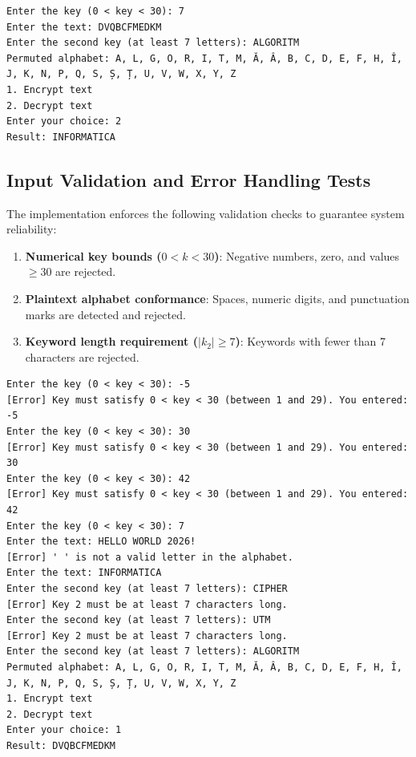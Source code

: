 \documentclass[12pt,a4paper]{article}
\begin{document}
\begin{lstlisting}[caption={Task 2 Decryption Execution}]
Enter the key (0 < key < 30): 7
Enter the text: DVQBCFMEDKM
Enter the second key (at least 7 letters): ALGORITM
Permuted alphabet: A, L, G, O, R, I, T, M, Ă, Â, B, C, D, E, F, H, Î, J, K, N, P, Q, S, Ș, Ț, U, V, W, X, Y, Z
1. Encrypt text
2. Decrypt text
Enter your choice: 2
Result: INFORMATICA
\end{lstlisting}

\subsection{Input Validation and Error Handling Tests}
The implementation enforces the following validation checks to guarantee system reliability:
\begin{enumerate}
    \item \textbf{Numerical key bounds ($0 < k < 30$)}: Negative numbers, zero, and values $\ge 30$ are rejected.
    \item \textbf{Plaintext alphabet conformance}: Spaces, numeric digits, and punctuation marks are detected and rejected.
    \item \textbf{Keyword length requirement ($|k_2| \ge 7$)}: Keywords with fewer than 7 characters are rejected.
\end{enumerate}

\begin{lstlisting}[caption={Input Validation Demonstration in Console}]
Enter the key (0 < key < 30): -5
[Error] Key must satisfy 0 < key < 30 (between 1 and 29). You entered: -5
Enter the key (0 < key < 30): 30
[Error] Key must satisfy 0 < key < 30 (between 1 and 29). You entered: 30
Enter the key (0 < key < 30): 42
[Error] Key must satisfy 0 < key < 30 (between 1 and 29). You entered: 42
Enter the key (0 < key < 30): 7
Enter the text: HELLO WORLD 2026!
[Error] ' ' is not a valid letter in the alphabet.
Enter the text: INFORMATICA
Enter the second key (at least 7 letters): CIPHER
[Error] Key 2 must be at least 7 characters long.
Enter the second key (at least 7 letters): UTM
[Error] Key 2 must be at least 7 characters long.
Enter the second key (at least 7 letters): ALGORITM
Permuted alphabet: A, L, G, O, R, I, T, M, Ă, Â, B, C, D, E, F, H, Î, J, K, N, P, Q, S, Ș, Ț, U, V, W, X, Y, Z
1. Encrypt text
2. Decrypt text
Enter your choice: 1
Result: DVQBCFMEDKM
\end{lstlisting}

\end{document}
